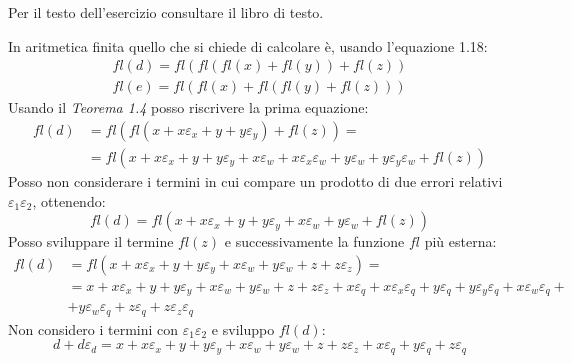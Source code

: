 \begin{exercise}[1.15]
Per il testo dell'esercizio consultare il libro di testo.
\end{exercise}
In aritmetica finita quello che si chiede di calcolare \`e, usando l'equazione 1.18:
\begin{displaymath}
\begin{split}
	fl(d) = fl(fl(fl(x) + fl(y)) + fl(z)) \\
	fl(e) = fl(fl(x) + fl(fl(y) + fl(z)))
\end{split}
\end{displaymath}
Usando il \emph{Teorema 1.4} posso riscrivere la prima equazione:
\begin{displaymath}
\begin{split}
	fl(d) &= fl(fl(x + x\varepsilon_{x} + y + y\varepsilon_{y}) + fl(z)) = \\
	  &=  fl(x + x\varepsilon_{x} + y + y\varepsilon_{y} + 
			x\varepsilon_{w} + x\varepsilon_{x}\varepsilon_{w} + 
			y\varepsilon_{w} + y\varepsilon_{y}\varepsilon_{w} + fl(z))
\end{split}
\end{displaymath}
Posso non considerare i termini in cui compare un prodotto di due errori relativi
$\varepsilon_{1} \varepsilon_{2}$, ottenendo:
\begin{displaymath}
	fl(d) = fl(x + x\varepsilon_{x} + y + y\varepsilon_{y} + 
			x\varepsilon_{w} +  y\varepsilon_{w} + fl(z))
\end{displaymath}
Posso sviluppare il termine $fl(z)$ e successivamente la funzione $fl$ pi\`u esterna:
\begin{displaymath}
\begin{split}
	fl(d) &= fl(x + x\varepsilon_{x} + y + y\varepsilon_{y} + 
			x\varepsilon_{w} +  y\varepsilon_{w} + z + z\varepsilon_{z}) = \\
	  &= x + x\varepsilon_{x} + y + y\varepsilon_{y} + 
			x\varepsilon_{w} +  y\varepsilon_{w} + z + z\varepsilon_{z} + 
		x\varepsilon_{q} + x\varepsilon_{x}\varepsilon_{q} + y\varepsilon_{q} + 
			y\varepsilon_{y}\varepsilon_{q} + 
			x\varepsilon_{w}\varepsilon_{q} + \\
	  &+  y\varepsilon_{w}\varepsilon_{q} +
			 z\varepsilon_{q} + z\varepsilon_{z}\varepsilon_{q}
\end{split}
\end{displaymath}
Non considero i termini con $\varepsilon_{1} \varepsilon_{2}$ e sviluppo $fl(d)$:
\begin{displaymath}
	d + d\varepsilon_{d} = x + x\varepsilon_{x} + y + y\varepsilon_{y} + 
			x\varepsilon_{w} +  y\varepsilon_{w} + z + z\varepsilon_{z} + 
		x\varepsilon_{q} + y\varepsilon_{q} + 
			 z\varepsilon_{q}
\end{displaymath}
